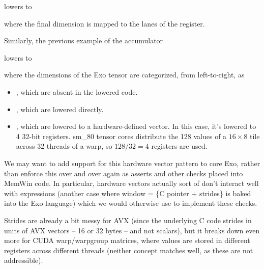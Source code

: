 
lowers to


where the final  dimension is mapped to the lanes of the  register.

\filbreak
Similarly, the previous example of the  accumulator


lowers to


where the dimensions of the Exo  tensor are categorized, from left-to-right, as

\filbreak
\begin{itemize}
  \item {} \lighttt{[\violetBox{4}, \greenBox{2},...}, which are absent in the lowered code.
  \filbreak
  \item {} , which are lowered directly.
  \filbreak
  \item {} \lighttt{..., \blueBox{16, 8}]}, which are lowered to a hardware-defined vector. In this case, it's lowered to 4 32-bit registers. sm\_80 tensor cores distribute the 128 values of a $16 \times 8$ tile across 32 threads of a warp, so $128 / 32 = 4$ registers are used.
\end{itemize}

\filbreak
We may want to add support for this hardware vector pattern to core Exo, rather than enforce this over and over again as asserts and other checks placed into MemWin code.
In particular, hardware vectors actually sort of don't interact well with  expressions (another case where window = \{C pointer + strides\} is baked into the Exo language) which we would otherwise use to implement these checks.

\filbreak
Strides are already a bit messy for AVX (since the underlying C code strides in units of AVX vectors -- 16 or 32 bytes -- and not scalars), but it breaks down even more for CUDA warp/warpgroup matrices, where values are stored in different registers across different threads (neither concept matches  well, as these are not addressible).

